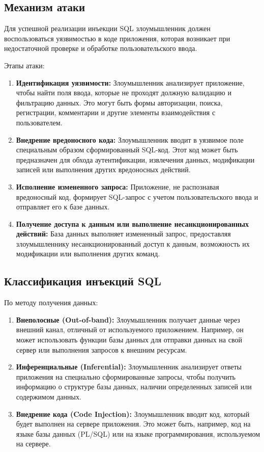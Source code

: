 \documentclass[a4paper,12pt]{diplom}
\begin{document}
	
	\subsection{Механизм атаки}
	
	Для успешной реализации инъекции SQL злоумышленник должен воспользоваться уязвимостью в коде приложения, которая возникает при недостаточной проверке и обработке пользовательского ввода. 
	
	Этапы атаки:
	\begin{enumerate}[label=\arabic{enumi})]
		\item \textbf{Идентификация уязвимости: }
			Злоумышленник анализирует приложение, чтобы найти поля ввода, которые не проходят должную валидацию и фильтрацию данных.  Это могут быть формы авторизации, поиска, регистрации, комментарии и другие элементы взаимодействия с пользователем. 
		\item \textbf{Внедрение вредоносного кода: }
			Злоумышленник вводит в уязвимое поле специальным образом сформированный SQL-код. Этот код может быть предназначен для обхода аутентификации, извлечения данных, модификации записей или выполнения других вредоносных действий.
		\item \textbf{Исполнение измененного запроса: }
			Приложение, не распознавая вредоносный код, формирует SQL-запрос с учетом пользовательского ввода и отправляет его к базе данных. 
		\item \textbf{Получение доступа к данным или выполнение несанкционированных действий: }
			База данных выполняет измененный запрос, предоставляя злоумышленнику 	несанкционированный доступ к данным, возможность их модификации или выполнения других команд. 
	\end{enumerate}
	
	
	\subsection{Классификация инъекций SQL}
	
	По методу получения данных:
	\begin{enumerate}[label=\arabic{enumi})]
		\item \textbf{Внеполосные (Out-of-band): }
		Злоумышленник получает данные через внешний канал, отличный от используемого приложением.  Например, он может использовать функции базы данных для отправки данных на свой сервер или выполнения запросов к внешним ресурсам.
		\item \textbf{ Инференциальные (Inferential): }
		Злоумышленник анализирует ответы приложения на специально сформированные запросы, чтобы получить информацию о структуре базы данных, наличии определенных записей или содержимом данных.
		\item \textbf{Внедрение кода (Code Injection): }
		Злоумышленник вводит код, который будет выполнен на сервере приложения. Это может быть, например, код на языке базы данных (PL/SQL) или на языке программирования, используемом на сервере.
	\end{enumerate}
	
\end{document}
